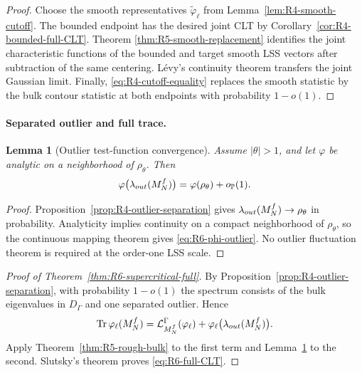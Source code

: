 \documentclass[10pt,a4paper]{amsart}
\newtheorem{lemma}[theorem]{Lemma}
\newcommand{\Tr}{\operatorname{Tr}}
\begin{document}
\begin{proof}
Choose the smooth representatives
\(\widetilde\varphi_\ell\) from
Lemma~\ref{lem:R4-smooth-cutoff}.  The bounded endpoint has the desired joint
CLT by Corollary~\ref{cor:R4-bounded-full-CLT}.  Theorem
\ref{thm:R5-smooth-replacement} identifies the joint characteristic
functions of the bounded and target smooth LSS vectors after subtraction of
the same centering.  L\'evy's continuity theorem transfers the joint Gaussian
limit.  Finally, \eqref{eq:R4-cutoff-equality} replaces the smooth statistic
by the bulk contour statistic at both endpoints with probability \(1-o(1)\).
\end{proof}


\paragraph{Separated outlier and full trace.}
\label{sec:R6-package}

\begin{lemma}[Outlier test-function convergence]
\label{lem:R6-outlier-function}
Assume \(|\theta|>1\), and let \(\varphi\) be analytic on a neighborhood of
\(\rho_\theta\).  Then
\begin{equation}\label{eq:R6-phi-outlier}
 \varphi\bigl(\lambda_{\rm out}(M_N^f)\bigr)
 =\varphi(\rho_\theta)+o_{\mathbb P}(1).
\end{equation}
\end{lemma}

\begin{proof}
Proposition~\ref{prop:R4-outlier-separation} gives
\(\lambda_{\rm out}(M_N^f)\to\rho_\theta\) in probability.  Analyticity implies
continuity on a compact neighborhood of \(\rho_\theta\), so the continuous
mapping theorem gives \eqref{eq:R6-phi-outlier}.  No outlier fluctuation
theorem is required at the order-one LSS scale.
\end{proof}

\begin{proof}[Proof of Theorem~\ref{thm:R6-supercritical-full}]

By Proposition~\ref{prop:R4-outlier-separation}, with probability \(1-o(1)\)
the spectrum consists of the bulk eigenvalues in \(D_\Gamma\) and one
separated outlier.  Hence
\[
 \Tr\varphi_\ell(M_N^f)
 =
 \mathcal L_{M_N^f}^\Gamma(\varphi_\ell)
 +\varphi_\ell\bigl(\lambda_{\rm out}(M_N^f)\bigr).
\]
Apply Theorem~\ref{thm:R5-rough-bulk} to the first term and
Lemma~\ref{lem:R6-outlier-function} to the second.  Slutsky's theorem proves
\eqref{eq:R6-full-CLT}.
\end{proof}
\end{document}
